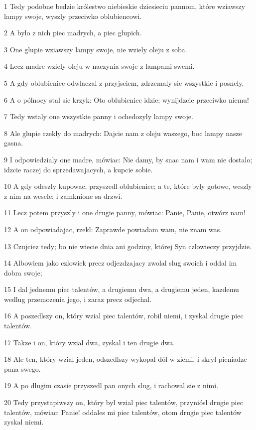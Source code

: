 \par 1 Tedy podobne bedzie królestwo niebieskie dziesieciu pannom, które wziawszy lampy swoje, wyszly przeciwko oblubiencowi.
\par 2 A bylo z nich piec madrych, a piec glupich.
\par 3 One glupie wziawszy lampy swoje, nie wziely oleju z soba.
\par 4 Lecz madre wziely oleju w naczynia swoje z lampami swemi.
\par 5 A gdy oblubieniec odwlaczal z przyjsciem, zdrzemaly sie wszystkie i posnely.
\par 6 A o pólnocy stal sie krzyk: Oto oblubieniec idzie; wynijdzcie przeciwko niemu!
\par 7 Tedy wstaly one wszystkie panny i ochedozyly lampy swoje.
\par 8 Ale glupie rzekly do madrych: Dajcie nam z oleju waszego, boc lampy nasze gasna.
\par 9 I odpowiedzialy one madre, mówiac: Nie damy, by snac nam i wam nie dostalo; idzcie raczej do sprzedawajacych, a kupcie sobie.
\par 10 A gdy odeszly kupowac, przyszedl oblubieniec; a te, które byly gotowe, weszly z nim na wesele; i zamknione sa drzwi.
\par 11 Lecz potem przyszly i one drugie panny, mówiac: Panie, Panie, otwórz nam!
\par 12 A on odpowiadajac, rzekl: Zaprawde powiadam wam, nie znam was.
\par 13 Czujciez tedy; bo nie wiecie dnia ani godziny, której Syn czlowieczy przyjdzie.
\par 14 Albowiem jako czlowiek precz odjezdzajacy zwolal slug swoich i oddal im dobra swoje;
\par 15 I dal jednemu piec talentów, a drugiemu dwa, a drugiemu jeden, kazdemu wedlug przemozenia jego, i zaraz precz odjechal.
\par 16 A poszedlszy on, który wzial piec talentów, robil niemi, i zyskal drugie piec talentów.
\par 17 Takze i on, który wzial dwa, zyskal i ten drugie dwa.
\par 18 Ale ten, który wzial jeden, odszedlszy wykopal dól w ziemi, i skryl pieniadze pana swego.
\par 19 A po dlugim czasie przyszedl pan onych slug, i rachowal sie z nimi.
\par 20 Tedy przystapiwszy on, który byl wzial piec talentów, przyniósl drugie piec talentów, mówiac: Panie! oddales mi piec talentów, otom drugie piec talentów zyskal niemi.
